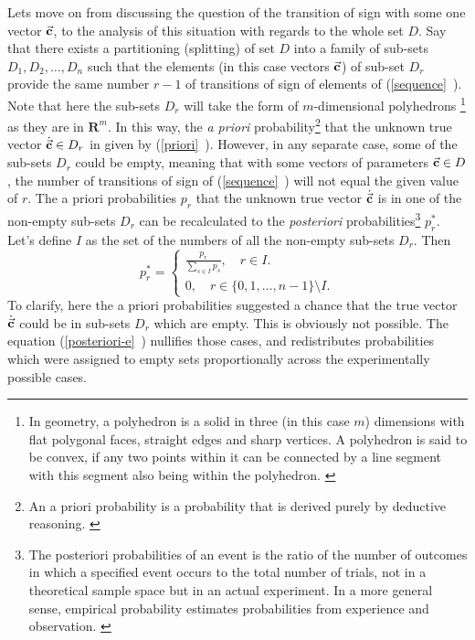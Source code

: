 Lets move on from discussing the question of the transition of sign with some one vector $\vec{\textbf{c}}$, to the analysis of this situation with regards to the whole set $D$. Say that there exists a partitioning (splitting) of set $D$ into a family of sub-sets $D_{1},D_{2},\dots,D_{n}$ such that the elements (in this case vectors $\vec{\textbf{c}}$) of sub-set $D_{r}$ provide the same number $r-1$ of transitions of sign of elements of (\vref{sequence}~). Note that here the sub-sets $D_{r}$ will take the form of $m$-dimensional polyhedrons \footnote{In geometry, a polyhedron is a solid in three (in this case $m$) dimensions with flat polygonal faces, straight edges and sharp vertices. A polyhedron is said to be convex, if any two points within it can be connected by a line segment with this segment also being within the polyhedron.  \cite{cromwell_1999}} as they are in $\boldsymbol{R}^{m}$. In this way, the \textit{a priori} probability\footnote{An a priori probability is a probability that is derived purely by deductive reasoning.  \cite{mood_graybill_boes_1974}} that the unknown true vector $\dot{\vec{\textbf{c}}} \in D_{r}$ in given by (\vref{priori}~). However, in any separate case, some of the sub-sets $D_{r}$ could be empty, meaning  that with some vectors of parameters $\vec{\textbf{c}} \in D$, the number of transitions of sign of (\vref{sequence}~) will not equal the given value of $r$. The a priori probabilities $p_{r}$ that the unknown true vector $\dot{\vec{\textbf{c}}}$ is in one of the non-empty sub-sets $D_{r}$ can be recalculated to the \textit{posteriori} probabilities\footnote{The posteriori probabilities of an event is the ratio of the number of outcomes in which a specified event occurs to the total number of trials, not in a theoretical sample space but in an actual experiment. In a more general sense, empirical probability estimates probabilities from experience and observation.  \cite{mood_graybill_boes_1974}} $p_{r}^{*}$. Let's define $I$ as the set of the numbers of all the non-empty sub-sets $D_{r}$. Then
\begin{equation}
p_{r}^{*}= 
\begin{cases} 
		\frac{p_{r}}{\sum\limits_{s \in I}p_{s}}, \quad r \in I.\\
		0, \quad r \in \{ 0,1,\dots,n-1 \} \setminus I.
\end{cases} \label{posteriori-e}
\end{equation}
To clarify, here the a priori probabilities suggested a chance that the true vector $\dot{\vec{\textbf{c}}}$ could be in sub-sets $D_{r}$ which are empty. This is obviously not possible. The equation (\vref{posteriori-e}~) nullifies those cases, and redistributes probabilities which were assigned to empty sets proportionally across the experimentally possible cases.\\
